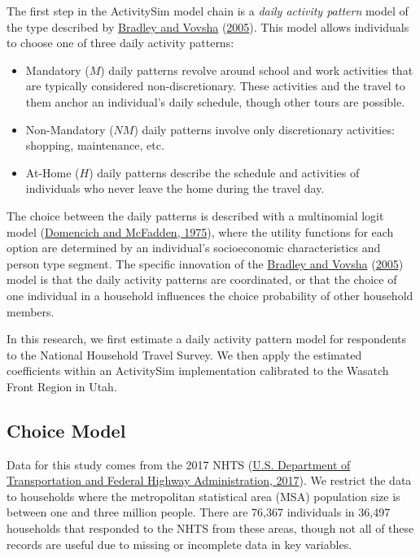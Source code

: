 \documentclass[3p, authoryear, review]{elsarticle} %
\providecommand{\tightlist}{%
  \setlength{\itemsep}{0pt}\setlength{\parskip}{0pt}}
\begin{document}
The first step in the ActivitySim model chain is a \emph{daily activity pattern}
model of the type described by \protect\hyperlink{ref-Bradley2005}{Bradley and Vovsha} (\protect\hyperlink{ref-Bradley2005}{2005}). This model
allows individuals to choose one of three daily activity patterns:

\begin{itemize}
\tightlist
\item
  Mandatory (\(M\)) daily patterns revolve around school and work activities that
  are typically considered non-discretionary. These activities and the travel
  to them anchor an individual's daily schedule, though other tours are possible.
\item
  Non-Mandatory (\(NM\)) daily patterns involve only discretionary activities:
  shopping, maintenance, etc.
\item
  At-Home (\(H\)) daily patterns describe the schedule and activities of
  individuals who never leave the home during the travel day.
\end{itemize}

The choice between the daily patterns is described with a multinomial logit
model (\protect\hyperlink{ref-Domencich1975}{Domencich and McFadden, 1975}), where the utility functions for each option are
determined by an individual's socioeconomic characteristics and person type
segment. The specific innovation of the \protect\hyperlink{ref-Bradley2005}{Bradley and Vovsha} (\protect\hyperlink{ref-Bradley2005}{2005}) model is that the daily
activity patterns are coordinated, or that the choice of one individual in a
household influences the choice probability of other household members.

In this research, we first estimate a daily activity pattern model for
respondents to the National Household Travel Survey. We then apply the estimated
coefficients within an ActivitySim implementation calibrated to the Wasatch Front
Region in Utah.

\hypertarget{choice-model}{%
\subsection{Choice Model}\label{choice-model}}

Data for this study comes from the 2017 NHTS (\protect\hyperlink{ref-fhwa2017}{U.S. Department of Transportation and Federal Highway Administration, 2017}). We restrict the
data to households where the metropolitan statistical area (MSA) population size
is between one and three million people. There are 76,367 individuals in 36,497
households that responded to the NHTS from these areas, though not all of these
records are useful due to missing or incomplete data in key variables.
\end{document}
